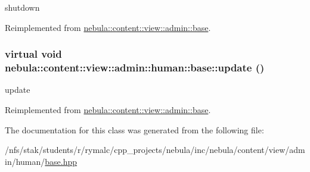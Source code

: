 shutdown 

Reimplemented from \hyperlink{classnebula_1_1content_1_1view_1_1admin_1_1base_a4002143535859c70b6cf7fc9c8dd8394}{nebula::content::view::admin::base}.\hypertarget{classnebula_1_1content_1_1view_1_1admin_1_1human_1_1base_a6ffdf9e2329934997591da7fedb75b6f}{
\subsubsection[{update}]{\setlength{\rightskip}{0pt plus 5cm}virtual void nebula::content::view::admin::human::base::update ()}}
\label{classnebula_1_1content_1_1view_1_1admin_1_1human_1_1base_a6ffdf9e2329934997591da7fedb75b6f}


update 

Reimplemented from \hyperlink{classnebula_1_1content_1_1view_1_1admin_1_1base_a6800944fd9dd37f6b15f0a9992bb3477}{nebula::content::view::admin::base}.

The documentation for this class was generated from the following file:\begin{DoxyCompactItemize}
\item 
/nfs/stak/students/r/rymalc/cpp\_\-projects/nebula/inc/nebula/content/view/admin/human/\hyperlink{inc_2nebula_2content_2view_2admin_2human_2base_8hpp}{base.hpp}\end{DoxyCompactItemize}
